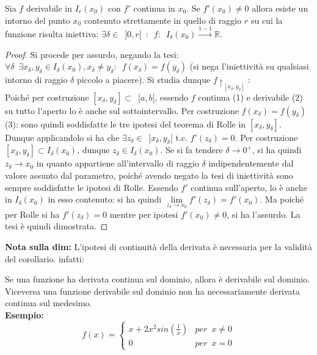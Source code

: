 \documentclass[10pt]{article}
\theoremstyle{plain}
\begin{document}
\begin{cor} Sia $f$ derivabile in $I_r(x_0)$ con $f'$ continua in $x_0$. Se $f'(x_0) \neq 0$ allora esiste un intorno del punto $x_0$ contenuto strettamente in quello di raggio $r$ su cui la funzione risulta iniettiva: $\exists \delta \in \enspace ]0, r[\enspace : \enspace f: \enspace I_\delta(x_0) \xrightarrow{1-1} \mathbb{R}$.
\end{cor}
\begin{proof}
Si procede per assurdo, negando la tesi: $\forall \delta \enspace \exists x_\delta, y_\delta \in I_\delta(x_0), x_\delta \neq y_\delta : \enspace f(x_\delta) = f(y_\delta)$ (si nega l'iniettività su qualsiasi intorno di raggio $\delta$ piccolo a piacere). Si studia dunque $f\restriction_{[x_\delta, y_\delta]}$: \\Poiché per costruzione $[x_\delta, y_\delta] \subset \enspace [a, b[$, essendo $f$ continua (1) e derivabile (2) su tutto l'aperto lo è anche sul sottointervallo. Per costruzione $f(x_\delta) = f(y_\delta)$ (3): sono quindi soddisfatte le tre ipotesi del teorema di Rolle in $[x_\delta, y_\delta]$. Dunque applicandolo si ha che $\exists z_\delta \in \enspace ]x_\delta, y_\delta[$ t.c. $f'(z_\delta) = 0$. Per costruzione $[x_\delta, y_\delta] \subset I_\delta(x_0)$, dunque $z_\delta \in I_\delta(x_0)$. Se si fa tendere $\delta \rightarrow 0^+$, si ha quindi $z_\delta \rightarrow x_0$ in quanto appartiene all'intervallo di raggio $\delta$ indipendentemente dal valore assunto dal parametro, poiché avendo negato la tesi di iniettività sono sempre soddisfatte le ipotesi di Rolle. Essendo $f'$ continua sull'aperto, lo è anche in $I_\delta(x_0)$ in esso contenuto: si ha quindi $\lim \limits_{z_\delta \rightarrow x_0} f'(z_\delta) = f'(x_0)$. Ma poiché per Rolle si ha $f'(z_\delta) = 0$ mentre per ipotesi $f'(x_0) \neq 0$, si ha l'assurdo. La tesi è quindi dimostrata.
\end{proof}
\textbf{Nota sulla dim:} L'ipotesi di continuità della derivata è necessaria per la validità del corollario. infatti:
\begin{oss} Se una funzione ha derivata continua sul dominio, allora è derivabile sul dominio. Viceversa una funzione derivabile sul dominio non ha necessariamente derivata continua sul medesimo.\\
\textbf{Esempio:}
\[f(x) = \begin{cases}
  x + 2 x^2 sin(\frac{1}{x}) &{per} \enspace x \neq 0 \\
  0 &{per} \enspace x = 0
\end{cases}\]
\end{oss}
\end{document}
